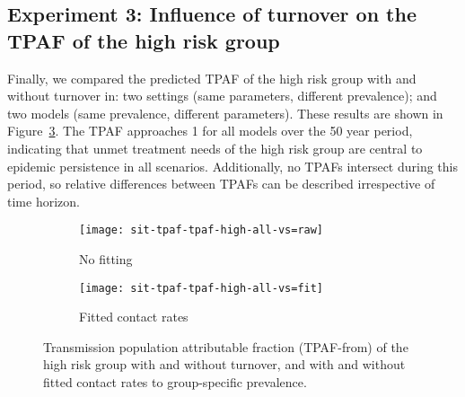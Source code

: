 \subsection{Experiment 3: Influence of turnover on the TPAF of the high risk group}
\label{ss:res-tpaf}
Finally, we compared the predicted TPAF of the high risk group with and without turnover in:
two settings (same parameters, different prevalence); and
two models (same prevalence, different parameters).
These results are shown in Figure~\ref{fig:tpaf}.
The TPAF approaches 1 for all models over the 50 year period,
indicating that unmet treatment needs of the high risk group
are central to epidemic persistence in all scenarios.
Additionally, no TPAFs intersect during this period,
so relative differences between TPAFs can be described irrespective of time horizon.
\begin{figure}[!tbp]
  \centering
  \begin{subfigure}{0.45\linewidth}
    \centering
    \texttt{[image: sit-tpaf-tpaf-high-all-vs=raw]}
    \caption{No fitting}
    \label{fig:tpaf-raw}
  \end{subfigure}
  \begin{subfigure}{0.45\linewidth}
    \centering
    \texttt{[image: sit-tpaf-tpaf-high-all-vs=fit]}
    \caption{Fitted contact rates}
    \label{fig:tpaf-fit}
  \end{subfigure}
  \caption{Transmission population attributable fraction (TPAF-from)
    of the high risk group with and without turnover,
    and with and without fitted contact rates to group-specific prevalence.}
  \label{fig:tpaf}
\end{figure}
